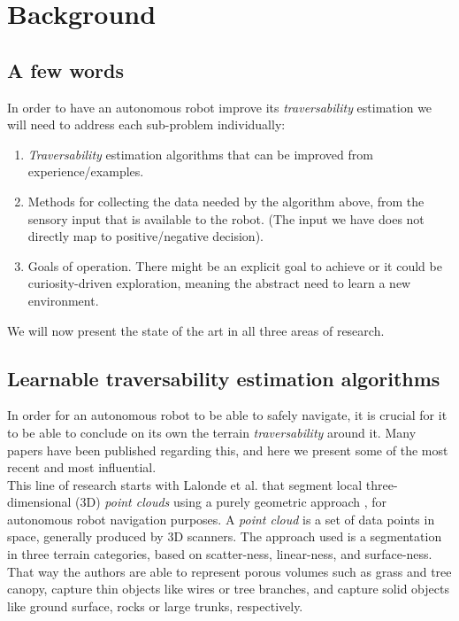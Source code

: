\documentclass[12pt,a4paper]{report}
\newcommand{\term}{\textit}
\newcommand{\acronym}{\MakeUppercase}
\begin{document}
	\chapter{Background}
	\label{sec:bg}
	
	\section{A few words}
	\label{sec:bg:intro}
	
	In order to have an autonomous robot improve its \term{traversability} 
	estimation we will need to address each sub-problem individually:
	
	\begin{enumerate}
		\item \term{Traversability} estimation algorithms that can be improved from 
		experience/examples.
		\item Methods for collecting the data needed by the algorithm above, from 
		the sensory input that is available to the robot. (The input we have does not 
		directly map to positive/negative decision).
		\item Goals of operation. There might be an explicit goal to achieve or it 
		could be curiosity-driven exploration, meaning the abstract need to learn a 
		new environment.
	\end{enumerate}
	
	We will now present the state of the art in all three areas of research.
	\\
	
	\section{Learnable traversability estimation algorithms}
	\label{sec:bg:trav}
	
	In order for an autonomous robot to be able to safely navigate, it is crucial 
	for it to be able to conclude on its own the terrain \term{traversability} 
	around it. Many papers have been published regarding this, and here we present 
	some of the most recent and most influential.
	\\
	
	This line of research starts with Lalonde et al. that segment local three-
	dimensional (\acronym{3d}) \term{point clouds} using a purely geometric 
	approach \cite{Lalonde}, for autonomous robot navigation purposes. A 
	\term{point cloud} is a set of data points in space, generally produced by 
	\acronym{3d} scanners. The approach used is a segmentation in three terrain 
	categories, based on scatter-ness, linear-ness, and surface-ness. That way 
	the authors are able to represent porous volumes such as grass and tree canopy, 
	capture thin objects like wires or tree branches, and capture solid objects 
	like ground surface, rocks or large trunks, respectively.
	\\	
	
\end{document}
